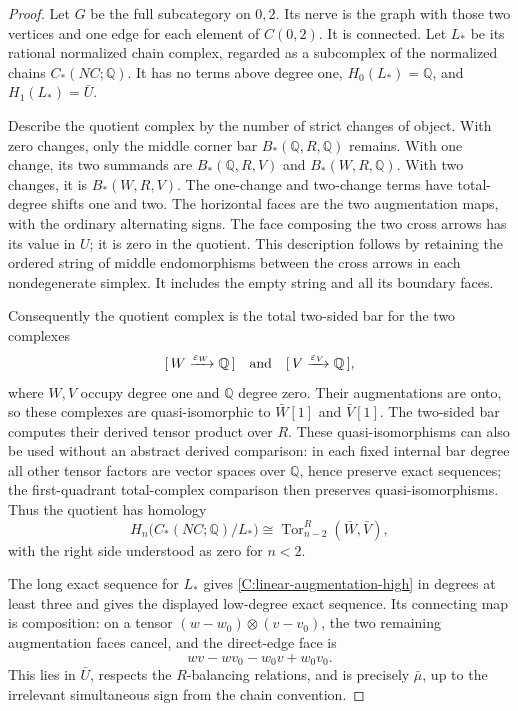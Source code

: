 \begin{proof}
Let $G$ be the full subcategory on $0,2$.  Its nerve is
the graph with those two vertices and one edge for each
element of $C(0,2)$.  It is connected.  Let $L_*$ be its
rational normalized chain complex, regarded as a
subcomplex of the normalized chains $C_*(NC;\mathbb Q)$.
It has no terms above degree one,
$H_0(L_*)=\mathbb Q$, and $H_1(L_*)=\bar U$.

Describe the quotient complex by the number of strict
changes of object.  With zero changes, only the middle
corner bar $B_*(\mathbb Q,R,\mathbb Q)$ remains.
With one change, its two summands are
$B_*(\mathbb Q,R,V)$ and $B_*(W,R,\mathbb Q)$.
With two changes, it is $B_*(W,R,V)$.  The one-change
and two-change terms have total-degree shifts one and
two.  The horizontal faces are the two augmentation
maps, with the ordinary alternating signs.  The face
composing the two cross arrows has its value in $U$;
it is zero in the quotient.  This description follows
by retaining the ordered string of middle endomorphisms
between the cross arrows in each nondegenerate simplex.
It includes the empty string and all its boundary faces.

Consequently the quotient complex is the total two-sided
bar for the two complexes
\[
 [\,W\xrightarrow{\varepsilon_W}\mathbb Q\,]
 \quad\hbox{and}\quad
 [\,V\xrightarrow{\varepsilon_V}\mathbb Q\,],
\]
where $W,V$ occupy degree one and $\mathbb Q$ degree zero.
Their augmentations are onto, so these complexes are
quasi-isomorphic to $\bar W[1]$ and $\bar V[1]$.
The two-sided bar computes their derived tensor product
over $R$.  These quasi-isomorphisms can also be used
without an abstract derived comparison: in each fixed
internal bar degree all other tensor factors are vector
spaces over $\mathbb Q$, hence preserve exact sequences;
the first-quadrant total-complex comparison then preserves
quasi-isomorphisms.  Thus the quotient has homology
\[
 H_n\bigl(C_*(NC;\mathbb Q)/L_*\bigr)
 \cong\operatorname{Tor}_{n-2}^R(\bar W,\bar V),
\]
with the right side understood as zero for $n<2$.

The long exact sequence for $L_*$ gives
\eqref{C:linear-augmentation-high} in degrees at least
three and gives the displayed low-degree exact sequence.
Its connecting map is composition: on a tensor
$(w-w_0)\otimes(v-v_0)$, the two remaining augmentation
faces cancel, and the direct-edge face is
\[
 wv-wv_0-w_0v+w_0v_0.
\]
This lies in $\bar U$, respects the $R$-balancing
relations, and is precisely $\bar\mu$, up to the
irrelevant simultaneous sign from the chain convention.
\end{proof}

